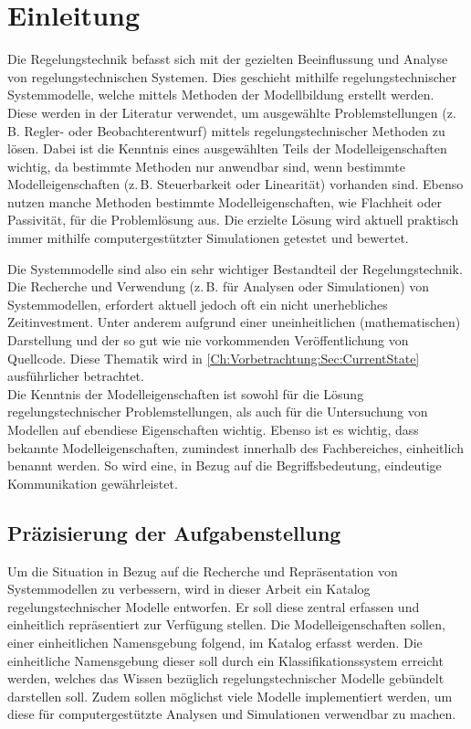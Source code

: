 \chapter{Einleitung}
\label{Ch:Einleitung}

Die Regelungstechnik befasst sich mit der gezielten Beeinflussung und Analyse von regelungstechnischen Systemen. Dies geschieht mithilfe regelungstechnischer Systemmodelle, welche mittels Methoden der Modellbildung erstellt werden. Diese werden in der Literatur verwendet, um ausgewählte Problemstellungen (z.\,B. Regler- oder Beobachterentwurf) mittels regelungstechnischer Methoden zu lösen. Dabei ist die Kenntnis eines ausgewählten Teils der Modelleigenschaften wichtig, da bestimmte Methoden nur anwendbar sind, wenn bestimmte Modelleigenschaften (z.\,B. Steuerbarkeit oder Linearität) vorhanden sind. Ebenso nutzen manche Methoden bestimmte Modelleigenschaften, wie Flachheit oder Passivität, für die Problemlösung aus. Die erzielte Lösung wird aktuell praktisch immer mithilfe computergestützter Simulationen getestet und bewertet.

Die Systemmodelle sind also ein sehr wichtiger Bestandteil der Regelungstechnik. Die Recherche und Verwendung (z.\,B. für Analysen oder Simulationen) von Systemmodellen, erfordert aktuell jedoch oft ein nicht unerhebliches Zeitinvestment. Unter anderem aufgrund einer uneinheitlichen (mathematischen) Darstellung und der so gut wie nie vorkommenden Veröffentlichung von Quellcode. Diese Thematik wird in \autoref{Ch:Vorbetrachtung:Sec:CurrentState} ausführlicher betrachtet. \\
Die Kenntnis der Modelleigenschaften ist sowohl für die Lösung regelungstechnischer Problemstellungen, als auch für die Untersuchung von Modellen auf ebendiese Eigenschaften wichtig. Ebenso ist es wichtig, dass bekannte Modelleigenschaften, zumindest innerhalb des Fachbereiches, einheitlich benannt werden. So wird eine, in Bezug auf die Begriffsbedeutung, eindeutige Kommunikation gewährleistet. 

\section{Präzisierung der Aufgabenstellung}
Um die Situation in Bezug auf die Recherche und Repräsentation von Systemmodellen zu verbessern, wird in dieser Arbeit ein Katalog regelungstechnischer Modelle entworfen. Er soll diese zentral erfassen und einheitlich repräsentiert zur Verfügung stellen. Die Modelleigenschaften sollen, einer einheitlichen Namensgebung folgend, im Katalog erfasst werden. Die einheitliche Namensgebung dieser soll durch ein Klassifikationssystem erreicht werden, welches das Wissen bezüglich regelungstechnischer Modelle gebündelt darstellen soll. Zudem sollen möglichst viele Modelle implementiert werden, um diese für computergestützte Analysen und Simulationen verwendbar zu machen. 




